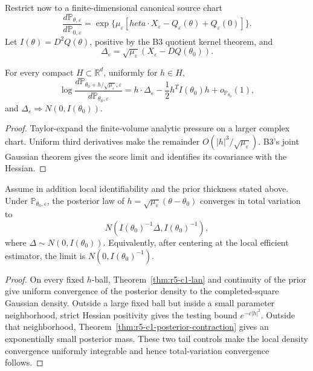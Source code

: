 Restrict now to a finite-dimensional canonical source chart
\[
 \frac{d\mathbb P_{\theta,\varepsilon}}
      {d\mathbb P_{0,\varepsilon}}
 =\exp\{\mu_\varepsilon[	heta\cdot X_\varepsilon
       -Q_\varepsilon(\theta)+Q_\varepsilon(0)]\}.
\]
Let \(I(\theta)=D^2Q(\theta)\), positive by the B3 quotient kernel theorem,
and
\[
 \Delta_\varepsilon=\sqrt{\mu_\varepsilon}
 (X_\varepsilon-DQ(\theta_0)).
\]

\begin{theorem}
\label{thm:r5-c1-lan}
For every compact \(H\subset\mathbb R^d\), uniformly for \(h\in H\),
\[
 \log\frac{d\mathbb P_{\theta_0+h/\sqrt{\mu_\varepsilon},\varepsilon}}
          {d\mathbb P_{\theta_0,\varepsilon}}
 =h\cdot\Delta_\varepsilon
 -\frac12h^TI(\theta_0)h+o_{\mathbb P_{\theta_0}}(1),
\]
and
\(\Delta_\varepsilon\Rightarrow N(0,I(\theta_0))\).
\end{theorem}

\begin{proof}
Taylor-expand the finite-volume analytic pressure on a larger complex chart.
Uniform third derivatives make the remainder
\(O(|h|^3/\sqrt{\mu_\varepsilon})\).  B3's joint Gaussian theorem gives the
score limit and identifies its covariance with the Hessian.
\end{proof}

\begin{theorem}
\label{thm:r5-c1-bvm}
Assume in addition local identifiability and the prior thickness stated above.
Under \(\mathbb P_{\theta_0,\varepsilon}\), the posterior law of
\(h=\sqrt{\mu_\varepsilon}(\theta-\theta_0)\) converges in total variation to
\[
 N\left(I(\theta_0)^{-1}\Delta,
        I(\theta_0)^{-1}\right),
\]
where \(\Delta\sim N(0,I(\theta_0))\).  Equivalently, after centering at the
local efficient estimator, the limit is
\(N(0,I(\theta_0)^{-1})\).
\end{theorem}

\begin{proof}
On every fixed \(h\)-ball, Theorem~\ref{thm:r5-c1-lan} and continuity of the
prior give uniform convergence of the posterior density to the completed-square
Gaussian density.  Outside a large fixed ball but inside a small parameter
neighborhood, strict Hessian positivity gives the testing bound
\(e^{-c|h|^2}\).  Outside that neighborhood,
Theorem~\ref{thm:r5-c1-posterior-contraction} gives an exponentially small
posterior mass.  These two tail controls make the local density convergence
uniformly integrable and hence total-variation convergence follows.
\end{proof}


